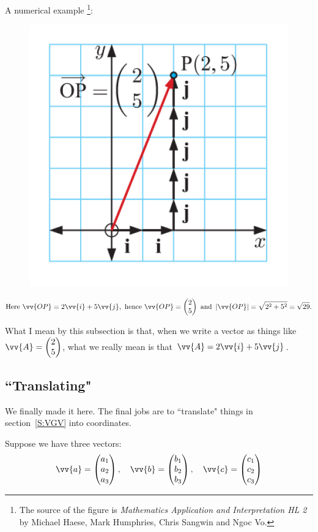 \documentclass[12pt, a4paper, reqno]{amsart}
\theoremstyle{definition}
\numberwithin{equation}{section} %
\begin{document}
A numerical example
\footnote{The source of the figure is \textit{Mathematics Application and Interpretation HL 2} by Michael Haese, Mark Humphries, Chris Sangwin and Ngoc Vo.}:
\begin{figure}[h]
	\centering\includegraphics[width=.25\linewidth]{13.png}
	\caption{}
\end{figure}
\begin{align*}
	\text{Here } \vv{OP}=2\vv{i}+5\vv{j}, \text{ hence } \vv{OP} =
	\begin{pmatrix}
		2	\\
		5
	\end{pmatrix}
	\text{ and } \left|\vv{OP}\right| = \sqrt{2^2 + 5^2} = \sqrt{29}.
\end{align*}

What I mean by this subsection is that, when we write a vector as things like $\vv{A}=\begin{pmatrix}
	2	\\
	5
\end{pmatrix}$, what we really mean is that $\vv{A}=2\vv{i}+5\vv{j}$.

\subsection{``Translating"}\label{SS:TRANS}\hfill

We finally made it here. The final jobs are to ``translate" things in section~\ref{S:VGV} into coordinates.

Suppose we have three vectors:
\begin{equation*}
	\vv{a} = 
	\begin{pmatrix}
		a_1	\\
		a_2 \\
		a_3
	\end{pmatrix},\quad
	\vv{b} = 
	\begin{pmatrix}
		b_1	\\
		b_2 \\
		b_3
	\end{pmatrix},\quad
	\vv{c} = 
	\begin{pmatrix}
		c_1	\\
		c_2 \\
		c_3
	\end{pmatrix}
\end{equation*}
\end{document}
